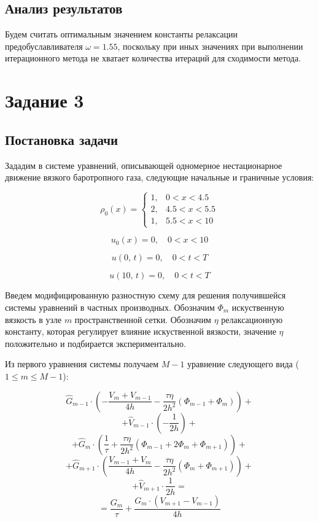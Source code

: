 \documentclass[12pt]{article}
\begin{document}
\begin{center}
\begin{tabular}{lllllllll}
\end{tabular}
\end{center}

\subsection{Анализ результатов}

Будем считать оптимальным значением константы релаксации пред\-обуслав\-ливателя $\omega = 1.55$, поскольку при иных значениях при выполнении итерационного метода не хватает количества итераций для сходимости метода.

\section{Задание 3}

\subsection{Постановка задачи}

Зададим в системе уравнений, описывающей одномерное нестационарное движение вязкого баротропного газа, следующие начальные и граничные условия:

$$
\rho_0(x) = 
\begin{cases}
1{,} & 0 < x < 4.5 \\
2{,} & 4.5 < x < 5.5\\
1{,} & 5.5 < x < 10
\end{cases}
$$

$$
u_0(x) = 0{,}\quad 0 < x < 10
$$

$$
u(0{,}\, t) = 0{,}\quad 0 < t < T 
$$

$$
u(10{,}\, t) = 0{,}\quad 0 < t < T 
$$

Введем модифицированную разностную схему для решения получившейся системы уравнений в частных производных.
Обозначим $\Phi_{m}$ искуственную вязкость в узле $m$ пространственной сетки. Обозначим $\eta$ ре\-лак\-саци\-онную константу, которая регулирует влияние искуственной вязкости, значение $\eta$ положительно и подбирается экс\-пери\-мен\-тально. 

Из первого уравнения системы получаем $M - 1$ уравнение следующего вида ($1 \leq m \leq M - 1$):

$$
\hat{G}_{m-1} \cdot \left( -\frac{V_m + V_{m-1}}{4h} - \frac{\tau\eta}{2h^2}\left(\Phi_{m-1} + \Phi_{m}\right) \right)
+
$$
$$
+ \hat{V}_{m-1} \cdot \left(-\frac{1}{2h}\right)
+
$$
$$
+ \hat{G}_{m} \cdot \left(\frac{1}{\tau} + \frac{\tau\eta}{2h^2}\left(\Phi_{m-1} + 2\Phi_{m} + \Phi_{m + 1}\right)\right)
+
$$
$$
+ \hat{G}_{m+1} \cdot \left(\frac{V_{m-1} + V_m}{4h} - \frac{\tau\eta}{2h^2}\left(\Phi_{m} + \Phi_{m+1}\right)\right)
+
$$
$$
+ \hat{V}_{m+1} \cdot \frac{1}{2h} = $$
$$
= \frac{G_m}{\tau} +
  \frac{G_m \cdot \left( V_{m+1} - V_{m-1} \right)}{4h}
$$
\end{document}
